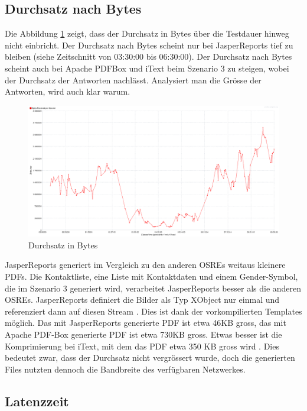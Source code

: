 \documentclass[main.tex]{subfiles}
\begin{document}
\subsection{Durchsatz nach Bytes}
Die Abbildung \ref{figure:throughputBytesAll} zeigt, dass der Durchsatz in Bytes über die Testdauer hinweg nicht einbricht. Der Durchsatz nach Bytes scheint nur bei JasperReports tief zu bleiben (siehe Zeitschnitt von 03:30:00 bis 06:30:00). Der Durchsatz nach Bytes scheint auch bei Apache PDFBox und iText beim Szenario 3 zu steigen,  wobei der Durchsatz der Antworten nachlässt. Analysiert man die Grösse der Antworten, wird auch klar warum. 
\begin{figure}[!h]
\includegraphics[width=\textwidth]{mainpart/4_analyse_img/ThroughputOverTimeAll.png}
 \caption{Durchsatz in Bytes}
 \label{figure:throughputBytesAll}
\end{figure}


JasperReports generiert im Vergleich zu den anderen OSREs weitaus kleinere PDFs. Die Kontaktliste, eine Liste mit Kontaktdaten und einem Gender-Symbol, die im Szenario 3 generiert wird, verarbeitet JasperReports besser als die anderen OSREs. JasperReports definiert die Bilder als Typ XObject nur einmal und referenziert dann auf diesen Stream \cite[vgl.~Kap.~5]{whitington_2012}. Dies ist dank der vorkompilierten Templates möglich. Das mit JasperReports generierte PDF ist etwa 46KB gross, das mit Apache PDF-Box generierte PDF ist etwa 730KB gross. Etwas besser ist die Komprimierung bei iText, mit dem das PDF etwa 350 KB gross wird \cite[vgl.~Kap~13]{lowagie_2010}. Dies bedeutet zwar, dass der Durchsatz nicht vergrössert wurde, doch die generierten Files nutzten dennoch die Bandbreite des verfügbaren Netzwerkes. 


\subsection{Latenzzeit}
\end{document}
